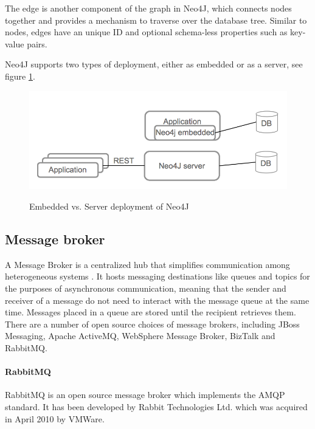 The edge is another component of the graph in Neo4J, which connects nodes together and provides a mechanism to traverse over the database tree. Similar to nodes, edges have an unique ID and optional schema-less properties such as key-value pairs.

Neo4J supports two types of deployment, either as embedded or as a server, see figure \ref{fig:neo4j}.

\begin{figure}[htb]
  \centering
  \includegraphics[scale=0.4]{neo4j_n.png}\\
  \caption{Embedded  vs. Server deployment of Neo4J}
  \label{fig:neo4j}
\end{figure}

\subsection{Message broker\label{sec:back_me_mid}}
A Message Broker is a centralized hub that simplifies communication among heterogeneous systems \cite{books/daglib/0013993}. It hosts messaging destinations like queues and topics for the purposes of asynchronous communication, meaning that the sender and receiver of a message do not need to interact with the message queue at the same time. Messages placed in a queue are stored until the recipient retrieves them. There are a number of open source choices of message brokers, including JBoss Messaging, Apache ActiveMQ, WebSphere Message Broker, BizTalk and RabbitMQ.

\paragraph{RabbitMQ}

RabbitMQ is an open source message broker which implements the \ac{AMQP} standard. It has been developed by Rabbit Technologies Ltd. which was acquired in April 2010 by VMWare.

